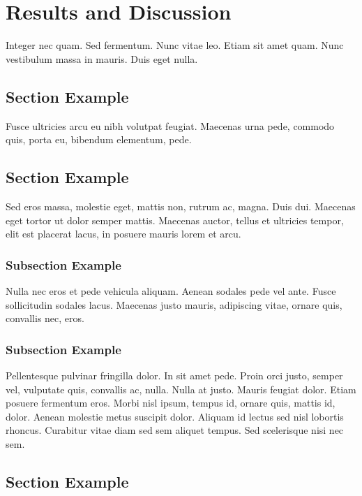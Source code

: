 \chapter{Results and Discussion}

Integer nec quam. Sed fermentum. Nunc vitae leo. Etiam sit amet
quam. Nunc vestibulum massa in mauris. Duis eget nulla. 

\section{Section Example}

Fusce ultricies arcu eu nibh volutpat feugiat. Maecenas urna pede, 
commodo quis, porta eu, bibendum elementum, pede. 

\section{Section Example}

Sed eros massa, molestie eget, mattis non, rutrum ac, magna. 
Duis dui. Maecenas eget tortor ut dolor semper mattis. 
Maecenas auctor, tellus et ultricies tempor, elit
est placerat lacus, in posuere mauris lorem et arcu. 

\subsection{Subsection Example}

Nulla nec eros et pede vehicula aliquam. Aenean sodales pede vel
ante. Fusce sollicitudin sodales lacus. Maecenas justo mauris,
adipiscing vitae, ornare quis, convallis nec, eros. 

\subsection{Subsection Example}

Pellentesque pulvinar fringilla dolor. In sit amet pede. 
Proin orci justo, semper vel, vulputate quis, convallis
ac, nulla. Nulla at justo. Mauris feugiat dolor. 
Etiam posuere fermentum eros. Morbi nisl ipsum, tempus id, 
ornare quis, mattis id, dolor. Aenean molestie metus 
suscipit dolor. Aliquam id lectus sed
nisl lobortis rhoncus. Curabitur vitae diam sed sem aliquet
tempus. Sed scelerisque nisi nec sem.

\section{Section Example}

